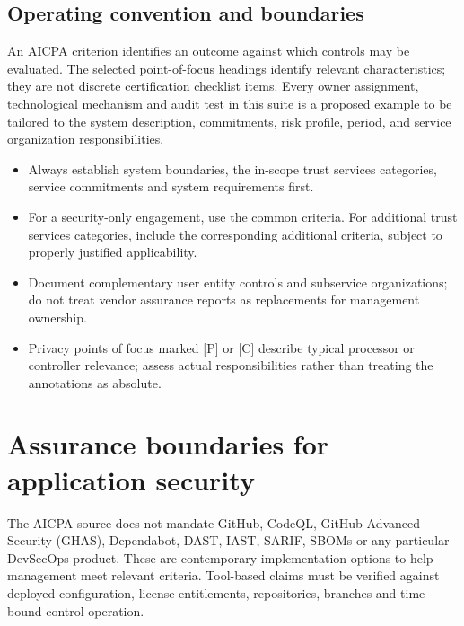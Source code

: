 \documentclass[10pt,oneside]{report}
\begin{document}
\section*{Operating convention and boundaries}
An AICPA criterion identifies an outcome against which controls may be evaluated. The selected point-of-focus headings identify relevant characteristics; they are not discrete certification checklist items. Every owner assignment, technological mechanism and audit test in this suite is a proposed example to be tailored to the system description, commitments, risk profile, period, and service organization responsibilities.

\begin{itemize}
\item Always establish system boundaries, the in-scope trust services categories, service commitments and system requirements first.
\item For a security-only engagement, use the common criteria. For additional trust services categories, include the corresponding additional criteria, subject to properly justified applicability.
\item Document complementary user entity controls and subservice organizations; do not treat vendor assurance reports as replacements for management ownership.
\item Privacy points of focus marked [P] or [C] describe typical processor or controller relevance; assess actual responsibilities rather than treating the annotations as absolute.
\end{itemize}

\chapter{Assurance boundaries for application security}
The AICPA source does not mandate GitHub, CodeQL, GitHub Advanced Security (GHAS), Dependabot, DAST, IAST, SARIF, SBOMs or any particular DevSecOps product. These are contemporary implementation options to help management meet relevant criteria. Tool-based claims must be verified against deployed configuration, license entitlements, repositories, branches and time-bound control operation.
\end{document}
